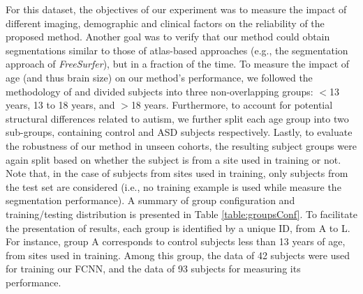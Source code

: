 \documentclass[twoside,fleqn,espcrc2]{elsarticle}
\newcommand{\FreeSurfer}{\textit{FreeSurfer}}
\begin{document}
For this dataset, the objectives of our experiment was to measure the impact of different imaging, demographic and clinical factors on the reliability of the proposed method. Another goal was to verify that our method could obtain segmentations similar to those of atlas-based approaches (e.g., the segmentation approach of \FreeSurfer{}), but in a fraction of the time. To measure the impact of age (and thus brain size) on our method's performance, we followed the methodology of \cite{aylward2002effects} and divided subjects into three non-overlapping groups: $<$13 years, 13 to 18 years, and $>$18 years. Furthermore, to account for potential structural differences related to autism, we further split each age group into two sub-groups, containing control and ASD subjects respectively. Lastly, to evaluate the robustness of our method in unseen cohorts, the resulting subject groups were again split based on whether the subject is from a site used in training or not. Note that, in the case of subjects from sites used in training, only subjects from the test set are considered (i.e., no training example is used while measure the segmentation performance). A summary of group configuration and training/testing distribution is presented in Table \ref{table:groupsConf}. To facilitate the presentation of results, each group is identified by a unique ID, from A to L. For instance, group A corresponds to control subjects less than 13 years of age, from sites used in training. Among this group, the data of 42 subjects were used for training our FCNN, and the data of 93 subjects for measuring its performance.
\end{document}
